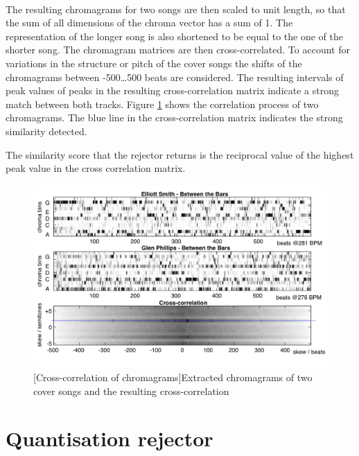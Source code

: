 \paragraph{}
The resulting chromagrams for two songs are then scaled to unit length, so that
the sum of all dimensions of the chroma vector has a sum of 1. The
representation of the longer song is also shortened to be equal to the one of
the shorter song. The chromagram matrices are then cross-correlated. To account
for variations in the structure or pitch of the cover songs the shifts of the
chromagrams between -500\dots500 beats are considered. The resulting intervals
of peak values of peaks in the resulting cross-correlation matrix indicate a
strong match between both tracks. Figure \ref{fig:cross-correlation} shows the
correlation process of two chromagrams. The blue line in the cross-correlation
matrix indicates the strong similarity detected.

The similarity score that the rejector returns is the reciprocal value of the
highest peak value in the cross correlation matrix.

\begin{figure}
    \centering
    \includegraphics[width=\textwidth]{Algorithms/cross-correlation.png}
    [Cross-correlation of chromagrams]{Extracted chromagrams of two cover songs and the resulting cross-correlation \cite{ellis2007identifyingcover}}
    \label{fig:cross-correlation}
\end{figure}

\section{Quantisation rejector}
\label{sec:quantisation}

